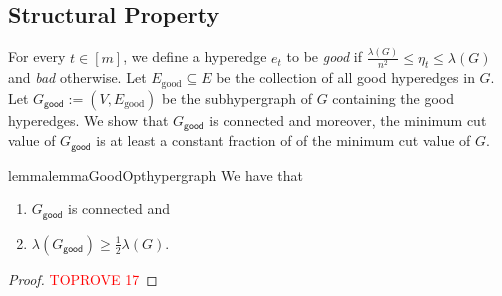 \documentclass[11pt]{article}
\newtheorem{corollary}{Corollary}
\theoremstyle{definition}
\newcommand{\good}{\mathsf{good}}
\newcommand{\opt}{\texttt{opt}}
\begin{document}
\subsection{Structural Property}\label{section:hypergraph-structural-property}
For every $t\in [m]$, we define a hyperedge $e_t$ to be \emph{good} if $\frac{\lambda(G)}{n^2}\leq \eta_t\leq \lambda(G)$ and \emph{bad} otherwise. Let $E_{\text{good}}\subseteq E$ be the collection of all good hyperedges in $G$. Let $G_{\good}:=(V,E_{\text{good}})$ be the subhypergraph of $G$ containing the good hyperedges. 
We show that $G_{\good}$ is connected and moreover, the minimum cut value of $G_{\good}$ is at least a constant fraction of of the minimum cut value of $G$.

\begin{restatable}{lemma}{lemmaGoodOpthypergraph}\label{lemma:new-opt-hypergraph}
We have that 
\begin{enumerate}
    \item $G_{\good}$ is connected and 
    \item $\lambda(G_{\good})\geq \frac{1}{2}\lambda(G)$. 
\end{enumerate}
\end{restatable}




\begin{proof}\textcolor{red}{TOPROVE 17}\end{proof}

\iffalse
We now restate and prove the main lemma of this section.
\lemmaGoodOpthypergraph*
\begin{proof}
    By Lemma~\ref{lemma:structure-property}, at least $\lambda(G)/2$ hyperedges in every cut of $G$ are good. This implies that $\lambda(H)\geq \frac{1}{2}\lambda(G)$. 
    We recall that $\opt(G)\geq 80\cdot \log^2n$. Hence, we have $$\lambda(H)\geq \frac{\lambda(G)}{2} \geq \frac{\opt(G)}{2} \geq 1,$$
    which implies that $H$ is connected. Hence, $f(E_{\good})=f(E)$.
\end{proof}
\fi

\iffalse
Let $E_{\text{good}}\subseteq E$ be the collection of all good hyperedges in $G$. Let $H:=(V,E_{\text{good}})$ be the subhypergraph of $G$ containing only good hyperedges. Lemma~\ref{lemma:structure-property} implies that removing all bad hyperedges in $G$ will not decrease the minimum cut value by more than a constant factor as summarized in the following corollary. 

\begin{corollary}\label{corollary:good-hyperedge-property}
    $\lambda(H)\geq\lambda(G)/2$.
\end{corollary}
\fi
\end{document}

